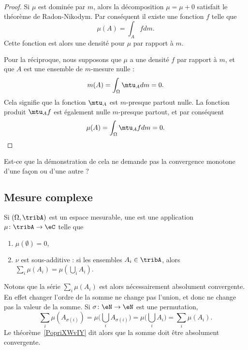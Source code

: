 \begin{proof}
    Si \( \mu\) est dominée par \( m\), alors la décomposition \( \mu=\mu+0\) satisfait le théorème de Radon-Nikodym. Par conséquent il existe une fonction \( f\) telle que
    \begin{equation}
        \mu(A)=\int_Afdm.
    \end{equation}
    Cette fonction est alors une densité pour \( \mu\) par rapport à \( m\).

    Pour la réciproque, nous supposons que \( \mu\) a une densité \( f\) par rapport à \( m\), et que \( A\) est une ensemble de \( m\)-mesure nulle :
    \begin{equation}
        m(A)=\int_{\Omega}\mtu_Adm=0.
    \end{equation}
    Cela signifie que la fonction \( \mtu_A\) est \( m\)-presque partout nulle. La fonction produit \( \mtu_Af\) est également nulle \( m\)-presque partout, et par conséquent
    \begin{equation}
        \mu(A)=\int_{\Omega}\mtu_Afdm=0.
    \end{equation}
\end{proof}

\begin{probleme}
    Est-ce que la démonstration de cela ne demande pas la convergence monotone d'une façon ou d'une autre ?
\end{probleme}

\subsection{Mesure complexe}

\begin{definition} \label{DefGKHLooYjocEt}
    Si \( (\Omega,\tribA)\) est un espace mesurable, une  est une application \( \mu\colon \tribA\to \eC\) telle que
    \begin{enumerate}
        \item
            $\mu(\emptyset)=0$,
        \item
            \( \nu\) est sous-additive : si les ensembles \( A_i\in\tribA\), alors \( \sum_i\mu(A_i)=\mu(\bigcup_iA_i)\).
    \end{enumerate}
\end{definition}
Notons que la série $\sum_i\mu(A_i)$ est alors nécessairement absolument convergente. En effet changer l'ordre de la somme ne change pas l'union, et donc ne change pas la valeur de la somme. Si \( \sigma\colon \eN\to \eN\) est une permutation,
\begin{equation}
    \sum_i\mu(A_{\sigma(i)})=\mu\big( \bigcup_iA_{\sigma(i)} \big)=\mu\big( \bigcup_iA_i \big)=\sum_i\mu(A_i).
\end{equation}
Le théorème~\ref{PopriXWvIY} dit alors que la somme doit être absolument convergente.


